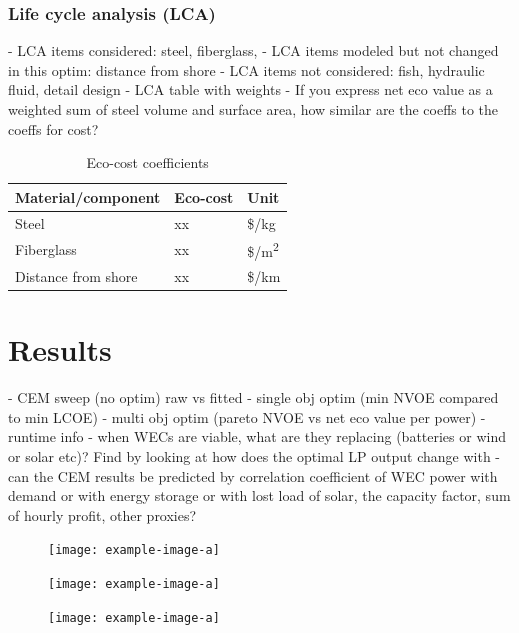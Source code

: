 \documentclass[10pt,twoside]{article}
\begin{document}
\subsubsection{Life cycle analysis (LCA)}
    -  LCA items considered: steel, fiberglass,
    -  LCA items modeled but not changed in this optim: distance from shore
    -  LCA items not considered: fish, hydraulic fluid, detail design
    -  LCA table with weights
    -  If you express net eco value as a weighted sum of steel volume and surface area, how similar are the coeffs to the coeffs for cost?

\begin{table}[H]
    \begin{center}
    \begin{tabular}{ lll } 
     \hline
     Material/component & Eco-cost & Unit \\ 
     \hline
     Steel & xx & \$/kg \\ 
     Fiberglass & xx & \$/m\textsuperscript{2} \\ 
     Distance from shore & xx & \$/km \\ 
    \end{tabular}
    \caption{Eco-cost coefficients}
    \label{tab:lca-weights}
    \end{center}
\end{table}


\section{Results}
    -  CEM sweep (no optim) raw vs fitted
    -  single obj optim (min NVOE compared to min LCOE)
    -  multi obj optim (pareto NVOE vs net eco value per power)
    -  runtime info
    -  when WECs are viable, what are they replacing (batteries or wind or solar etc)? Find by looking at how does the optimal LP output change with
    -  can the CEM results be predicted by correlation coefficient of WEC power with demand or with energy storage or with lost load of solar, the capacity factor, sum of hourly profit, other proxies?

\begin{figure}[b]
\noindent
\begin{minipage}[t]{0.32\textwidth}
    \centering
    \texttt{[image: example-image-a]}
    \label{fig:cem-results}
\end{minipage}
\hfill
\begin{minipage}[t]{0.32\textwidth}
    \centering
    \texttt{[image: example-image-a]}
    \label{fig:single-obj-compare}
\end{minipage}
\hfill
\begin{minipage}[t]{0.32\textwidth}
    \centering
    \texttt{[image: example-image-a]}
    \label{fig:pareto}
\end{minipage}
\end{figure}
\end{document}
